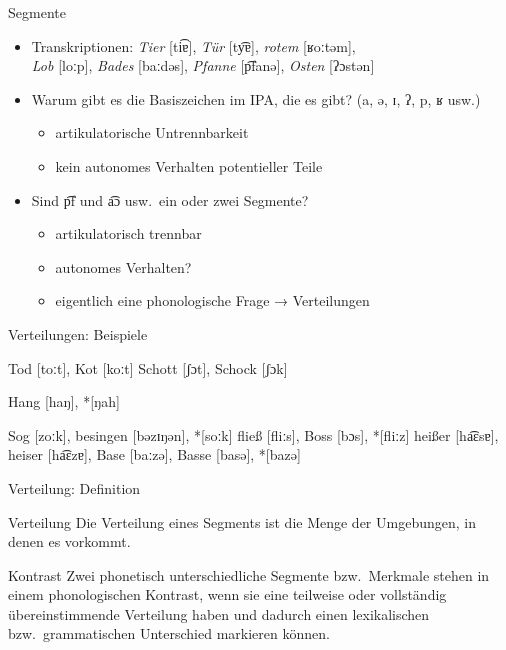 \begin{frame}
  {Segmente}
  \pause
  \begin{itemize}[<+->]
    \item Transkriptionen: \textit{Tier} [ti͡ɐ], \textit{Tür} [ty͡ɐ], \textit{rotem} [ʁoːtəm],\\
      \textit{Lob} [loːp], \textit{Bades} [baːdəs], \textit{Pfanne} [p͡fanə], \textit{Osten} [ʔɔstən]
      \vspace{\baselineskip}
    \item Warum gibt es die Basiszeichen im IPA, die es gibt? (a, ə, ɪ, ʔ, p, ʁ usw.)
      \begin{itemize}
        \item \alert{artikulatorische Untrennbarkeit}
        \item \alert{kein autonomes Verhalten potentieller Teile}
      \end{itemize}
      \vspace{\baselineskip}
    \item Sind p͡f und a͡ɔ usw.\ ein oder zwei Segmente? 
      \begin{itemize}
        \item artikulatorisch trennbar
        \item autonomes Verhalten?
        \item eigentlich eine phonologische Frage → Verteilungen
      \end{itemize}
  \end{itemize}
\end{frame}

\begin{frame}
  {Verteilungen: Beispiele}
  \pause
  \begin{exe}
    \ex
      \begin{xlist}
        \ex Tod [toːt], Kot [koːt]
        \pause
        \ex Schott [ʃɔt], Schock [ʃɔk]
      \end{xlist}
        \pause
    \ex Hang [haŋ], *[ŋah]
        \pause
    \ex
      \begin{xlist}
        \ex Sog [zoːk], besingen [bəzɪŋən], *[soːk]
        \pause
        \ex fließ [fliːs], Boss [bɔs], *[fliːz]
        \pause
        \ex heißer [ha͡ɛsɐ], heiser [ha͡ɛzɐ], Base [baːzə], Basse [basə], *[bazə]
      \end{xlist}
  \end{exe}
\end{frame}


\begin{frame}
  {Verteilung: Definition}
  \pause
  \Large
  \begin{block}{Verteilung}
    Die Verteilung eines Segments ist die Menge der Umgebungen, in denen es vorkommt.
  \end{block}
  \pause
  \Zeile
  \begin{block}{Kontrast}
    Zwei phonetisch unterschiedliche Segmente bzw.\ Merkmale stehen in einem phonologischen 
  Kontrast, wenn sie eine teilweise oder vollständig übereinstimmende Verteilung haben und dadurch einen lexikalischen bzw.\ grammatischen Unterschied markieren können.
  \end{block}
\end{frame}


